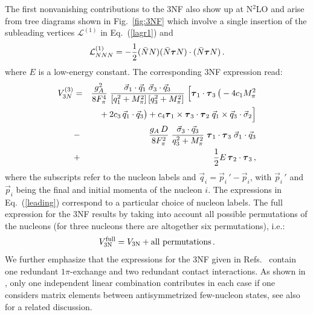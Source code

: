 \documentclass[aps,rmp,nofootinbib,twocolumn,floatfix]{revtex4}
\newcommand{\beq}{\begin{equation}}
\newcommand{\eeq}{\end{equation}}
\newcommand{\beqa}{\begin{eqnarray}}
\newcommand{\eeqa}{\end{eqnarray}}
\newcommand{\fet}[1]{\mbox{\boldmath $#1$}}
\newcommand{\nn}{\nonumber \\ }
\begin{document}
The first nonvanishing contributions to the 3NF also show up at N$^2$LO and
arise from tree diagrams shown in Fig.~\ref{fig:3NF} which involve a single
insertion of the subleading vertices $\mathcal{L}^{(1)}$ in Eq.~(\ref{lagr1})
and 
\beq
\mathcal{L}_{NNN}^{(1)} = - \frac{1}{2}  (\bar{N} N) (\bar{N} \fet \tau N)
\cdot (\bar{N} \fet \tau N)\,.
\eeq
where $E$ is a low-energy constant. 
The corresponding 3NF expression read: 
\beqa
\label{leading}
V_{3N}^{(3)} &=& \frac{g_A^2}{8 F_\pi^4}\; 
\frac{\vec \sigma_1 \cdot \vec q_1  \; \vec \sigma_3 \cdot \vec q_3 }{[
  q_1^2 + M_\pi^2] \, [q_3^2 + M_\pi^2]} \;\Big[ \fet \tau_1
  \cdot \fet \tau_3  \, \big( - 4 c_1 M_\pi^2 \nn
&& {} + 2 c_3 \, \vec q_1 \cdot \vec
    q_3 \big)  
+  c_4 \fet \tau_1
  \times \fet \tau_3  \cdot \fet \tau_2  \; \vec q_1 \times \vec q_3 
\cdot \vec \sigma_2  \Big]   \nn
&-& \frac{g_A \, D}{8 F_\pi^2}\;  
\frac{\vec \sigma_3 \cdot \vec q_3 }{q_3^2 + M_\pi^2} \; 
\fet \tau_1 \cdot \fet \tau_3 \; \vec \sigma_1 \cdot \vec q_3 \nn
&+& \frac{1}{2} E \, \fet \tau_2 \cdot \fet \tau_3 \,,
\eeqa
where the subscripts refer to the nucleon labels and $\vec q_{i} = \vec p_i \,
' - \vec p_i$,  with $\vec p_i \, '$
and $\vec p_i$ being the final and initial momenta of the nucleon $i$. 
The expressions in Eq.~(\ref{leading}) correspond to a particular 
choice of nucleon labels. The full expression for
the 3NF results by taking into account all possible permutations of the
nucleons (for 
three nucleons there are altogether six permutations), i.e.:
\beq
V_{\rm 3N}^{\rm full} = V_{\rm 3N} + \mbox{all permutations}\,.
\eeq
We further emphasize that the expressions for the 3NF given in Refs.~\cite{Ordonez:1992xp,vanKolck:1994yi}
contain one redundant $1\pi$-exchange and two redundant contact
interactions. As shown in \cite{Epelbaum:2002vt}, only one independent linear combination
contributes in each case if one considers matrix elements between
antisymmetrized few-nucleon states, see also \cite{Bedaque:1999ve} for a related discussion. 
\end{document}
